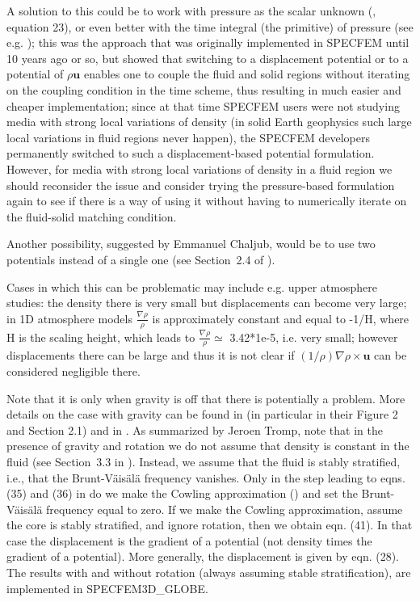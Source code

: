 A solution to this could be to work with pressure as the scalar unknown (\cite{God11}, equation 23),
or even better with the time integral (the primitive) of pressure (see e.g. \cite{Eve81});
this was the approach that was originally implemented in SPECFEM until 10 years ago or so, but \cite{ChVa04} showed that switching to a displacement potential
or to a potential of $\rho \mathbf{u}$ enables one to couple the fluid and solid regions without iterating on the coupling condition in the time scheme,
thus resulting in much easier and cheaper implementation; since at that time SPECFEM users were not studying media with strong local variations of density (in solid Earth
geophysics such large local variations in fluid regions never happen), the SPECFEM developers permanently switched to such a displacement-based potential formulation.
However, for media with strong local variations of density in a fluid region we should reconsider the issue and consider trying the pressure-based formulation again
to see if there is a way of using it without having to numerically iterate on the fluid-solid matching condition.
\newline

Another possibility, suggested by Emmanuel Chaljub, would be to use two potentials instead of a single one (see Section~2.4 of \cite{ChKoViCaVaFe07}).
\newline

Cases in which this can be problematic may include e.g. upper atmosphere studies: the density there is very small but displacements can become very large;
in 1D atmosphere models $\frac{\nabla \rho}{\rho}$ is approximately constant and equal to -1/H, where H is the scaling height,
which leads to $\frac{\nabla \rho}{\rho} \simeq$ 3.42*1e-5, i.e. very small; however displacements there can be large
and thus it is not clear if $(1/\rho)\nabla\rho\times\mathbf{u}$ can be considered negligible there.
\newline

Note that it is only when gravity is off that there is potentially a problem.
More details on the case with gravity can be found in \cite{ChVa04} (in particular in their Figure 2 and Section 2.1)
and in \cite{KoTsTr05}. As summarized by Jeroen Tromp, note that in the presence of gravity and rotation we do not assume that density is constant in the fluid
(see Section~3.3 in \cite{KoTsTr05}). Instead, we assume that the fluid is stably stratified, i.e., that the Brunt-V\"ais\"al\"a frequency vanishes.
Only in the step leading to eqns. (35) and (36) in \cite{KoTsTr05} do we make the Cowling approximation (\cite{Cow41}) and set the Brunt-V\"ais\"al\"a frequency equal to zero.
If we make the Cowling approximation, assume the core is stably stratified, and ignore rotation, then we obtain eqn. (41).
In that case the displacement is the gradient of a potential (not density times the gradient of a potential).
More generally, the displacement is given by eqn. (28). The results with and without rotation (always assuming stable stratification), are implemented in SPECFEM3D\_GLOBE.
\newline

